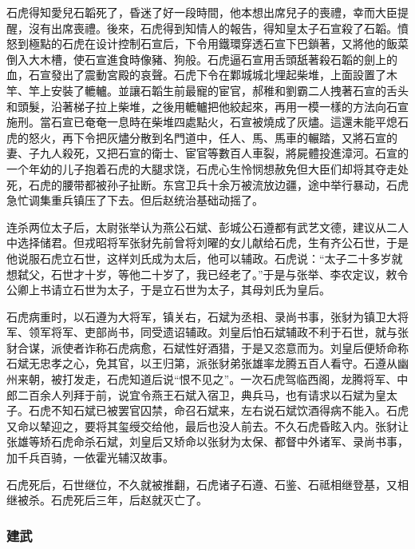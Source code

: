 石虎得知愛兒石韜死了，昏迷了好一段時間，他本想出席兒子的喪禮，幸而大臣提醒，沒有出席喪禮。後來，石虎得到知情人的報告，得知皇太子石宣殺了石韜。憤怒到極點的石虎在设计控制石宣后，下令用鐵環穿透石宣下巴鎖著，又將他的飯菜倒入大木槽，使石宣進食時像豬、狗般。石虎逼石宣用舌頭舐著殺石韜的劍上的血，石宣發出了震動宮殿的哀聲。石虎下令在鄴城城北埋起柴堆，上面設置了木竿、竿上安裝了轆轤。並讓石韜生前最寵的宦官，郝稚和劉霸二人拽著石宣的舌头和頭髮，沿著梯子拉上柴堆，之後用轆轤把他絞起來，再用一模一樣的方法向石宣施刑。當石宣已奄奄一息時在柴堆四處點火，石宣被燒成了灰燼。這還未能平熄石虎的怒火，再下令把灰燼分散到名門道中，任人、馬、馬車的輾踏，又將石宣的妻、子九人殺死，又把石宣的衛士、宦官等數百人車裂，將屍體投進漳河。石宣的一个年幼的儿子抱着石虎的大腿求饶，石虎心生怜悯想赦免但大臣们却将其夺走处死，石虎的腰带都被孙子扯断。东宫卫兵十余万被流放边疆，途中举行暴动，石虎急忙调集重兵镇压了下去。但后赵统治基础动摇了。

连杀两位太子后，太尉张举认为燕公石斌、彭城公石遵都有武艺文德，建议从二人中选择储君。但戎昭将军张豺先前曾将刘曜的女儿献给石虎，生有齐公石世，于是他说服石虎立石世，这样刘氏成为太后，他可以辅政。石虎说：“太子二十多岁就想弑父，石世才十岁，等他二十岁了，我已经老了。”于是与张举、李农定议，敕令公卿上书请立石世为太子，于是立石世为太子，其母刘氏为皇后。

石虎病重时，以石遵为大将军，镇关右，石斌为丞相、录尚书事，张豺为镇卫大将军、领军将军、吏部尚书，同受遗诏辅政。刘皇后怕石斌辅政不利于石世，就与张豺合谋，派使者诈称石虎病愈，石斌性好酒猎，于是又恣意而为。刘皇后便矫命称石斌无忠孝之心，免其官，以王归第，派张豺弟张雄率龙腾五百人看守。石遵从幽州来朝，被打发走，石虎知道后说“恨不见之”。一次石虎驾临西阁，龙腾将军、中郎二百余人列拜于前，说宜令燕王石斌入宿卫，典兵马，也有请求以石斌为皇太子。石虎不知石斌已被罢官囚禁，命召石斌来，左右说石斌饮酒得病不能入。石虎又命以辇迎之，要将其玺绶交给他，最后也没人前去。不久石虎昏眩入内。张豺让张雄等矫石虎命杀石斌，刘皇后又矫命以张豺为太保、都督中外诸军、录尚书事，加千兵百骑，一依霍光辅汉故事。

石虎死后，石世继位，不久就被推翻，石虎诸子石遵、石鉴、石祗相继登基，又相继被杀。石虎死后三年，后赵就灭亡了。

\subsubsection{建武}

